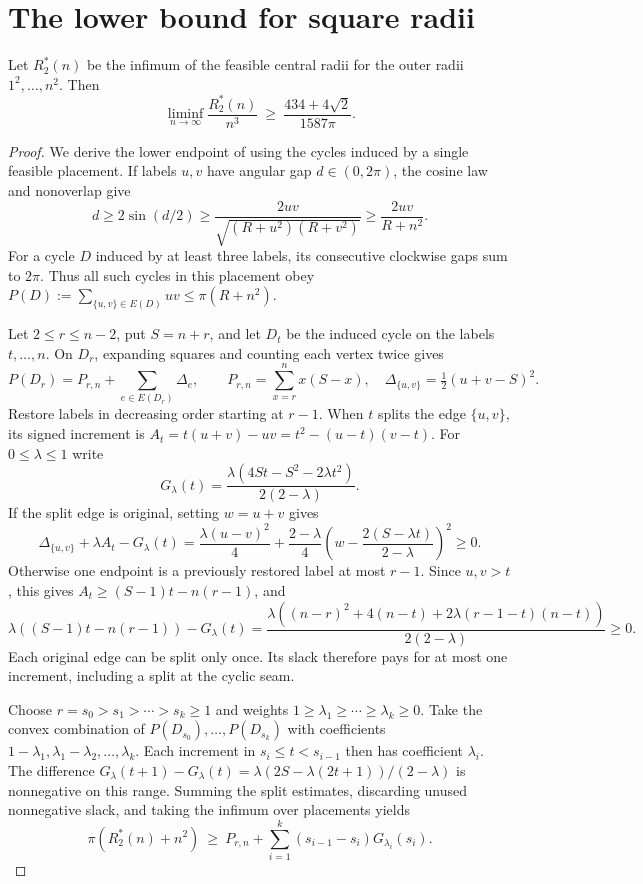 \section{The lower bound for square radii}\label{sec:square-lower}

\begin{theorem}\label{thm:square-lower}
Let $R_2^*(n)$ be the infimum of the feasible central radii for the
outer radii $1^2,\ldots,n^2$. Then
\[
 \liminf_{n\to\infty}\frac{R_2^*(n)}{n^3}
 \ \ge\ \frac{434+4\sqrt2}{1587\pi}.
\]
\end{theorem}
\begin{proof}
We derive the lower endpoint of \cite[(22)--(23)]{squared} using the
cycles induced by a single feasible placement. If labels $u,v$ have
angular gap $d\in(0,2\pi)$, the cosine law and nonoverlap give
\[
 d\ge2\sin(d/2)\ge
 \frac{2uv}{\sqrt{(R+u^2)(R+v^2)}}\ge \frac{2uv}{R+n^2}.
\]
For a cycle $D$ induced by at least three labels, its consecutive
clockwise gaps sum to $2\pi$. Thus all such cycles in this placement
obey $P(D):=\sum_{\{u,v\}\in E(D)}uv\le\pi(R+n^2)$.

Let $2\le r\le n-2$, put $S=n+r$, and let $D_t$ be the induced cycle
on the labels $t,\ldots,n$. On $D_r$, expanding squares and counting
each vertex twice gives
\[
 P(D_r)=P_{r,n}+\sum_{e\in E(D_r)}\Delta_e,\qquad
 P_{r,n}=\sum_{x=r}^n x(S-x),\quad
 \Delta_{\{u,v\}}=\tfrac12(u+v-S)^2.
\]
Restore labels in decreasing order starting at $r-1$. When $t$ splits
the edge $\{u,v\}$, its signed increment is
$A_t=t(u+v)-uv=t^2-(u-t)(v-t)$.
For $0\le\lambda\le1$ write
\[
 G_\lambda(t)=\frac{\lambda(4St-S^2-2\lambda t^2)}{2(2-\lambda)}.
\]
If the split edge is original, setting $w=u+v$ gives
\[
 \Delta_{\{u,v\}}+\lambda A_t-G_\lambda(t)
 =\frac{\lambda(u-v)^2}{4}
 +\frac{2-\lambda}{4}
 \left(w-\frac{2(S-\lambda t)}{2-\lambda}\right)^2\ge0.
\]
Otherwise one endpoint is a previously restored label at most $r-1$.
Since $u,v>t$, this gives $A_t\ge (S-1)t-n(r-1)$, and
\[
 \lambda((S-1)t-n(r-1))-G_\lambda(t)
 =\frac{\lambda((n-r)^2+4(n-t)+2\lambda(r-1-t)(n-t))}
        {2(2-\lambda)}\ge0 .
\]
Each original edge can be split only once. Its slack therefore pays
for at most one increment, including a split at the cyclic seam.

Choose $r=s_0>s_1>\cdots>s_k\ge1$ and weights
$1\ge\lambda_1\ge\cdots\ge\lambda_k\ge0$. Take the convex combination
of $P(D_{s_0}),\ldots,P(D_{s_k})$ with coefficients
$1-\lambda_1,\lambda_1-\lambda_2,\ldots,\lambda_k$. Each increment in
$s_i\le t<s_{i-1}$ then has coefficient $\lambda_i$.
The difference $G_\lambda(t+1)-G_\lambda(t)
=\lambda(2S-\lambda(2t+1))/(2-\lambda)$ is nonnegative on this range.
Summing the split estimates, discarding unused nonnegative slack, and
taking the infimum over placements yields
\begin{equation}\label{eq:square-finite}
 \pi(R_2^*(n)+n^2)\ \ge\
 P_{r,n}+\sum_{i=1}^k(s_{i-1}-s_i)G_{\lambda_i}(s_i).
\end{equation}


\end{proof}
